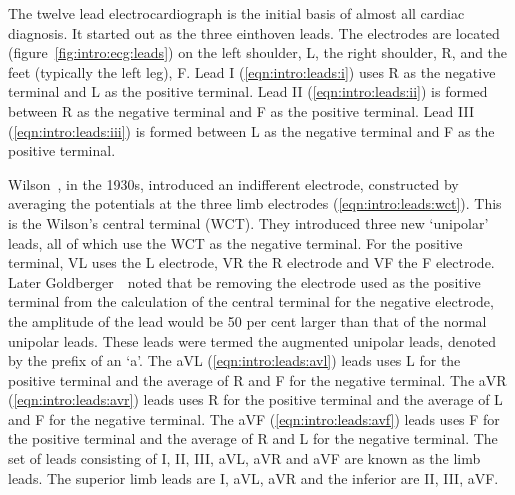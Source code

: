 The twelve lead electrocardiograph is the initial basis of almost all cardiac
diagnosis.
It started out as the three einthoven leads.
The electrodes are located (figure~\ref{fig:intro:ecg:leads}) on the left
shoulder, L, the right shoulder, R, and the feet (typically the left leg), F.
Lead I (\ref{eqn:intro:leads:i}) uses R as the negative terminal and L as the
positive terminal.
Lead II (\ref{eqn:intro:leads:ii}) is formed between R as the negative terminal
and F as the positive terminal.
Lead III (\ref{eqn:intro:leads:iii}) is formed between L as the negative terminal
and F as the positive terminal.

Wilson~\cite{Wilson1933}, in the 1930s, introduced an indifferent
electrode,  constructed by averaging the potentials at the three limb
electrodes (\ref{eqn:intro:leads:wct}).
This is the Wilson's central terminal (WCT).
They introduced three new `unipolar' leads, all of which use the WCT as the
negative terminal.
For the positive terminal, VL uses the L electrode, VR the R electrode and VF
the F electrode.
Later Goldberger~\cite{Goldberger1942}\ noted that be removing the electrode used
as the positive terminal from the calculation of the central terminal for the
negative electrode, the amplitude of the lead would be 50 per cent larger than
that of the normal unipolar leads.
These leads were termed the augmented unipolar leads, denoted by the prefix of
an `a'.
The aVL (\ref{eqn:intro:leads:avl}) leads uses L for the positive terminal and
the average of R and F for the negative terminal.
The aVR (\ref{eqn:intro:leads:avr}) leads uses R for the positive terminal and
the average of L and F for the negative terminal.
The aVF (\ref{eqn:intro:leads:avf}) leads uses F for the positive terminal and
the average of R and L for the negative terminal.
The set of leads consisting of I, II, III, aVL, aVR and aVF are known as the
limb leads.
The superior limb leads are I, aVL, aVR and the inferior are II, III, aVF.

